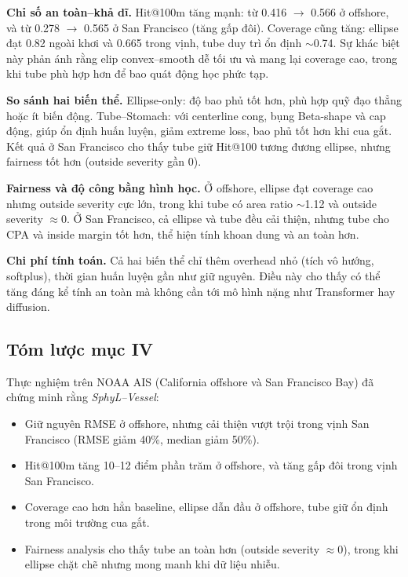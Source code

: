 \documentclass{IEEEtran}
\begin{document}
\textbf{Chỉ số an toàn--khả dĩ.} 
Hit@100m tăng mạnh: từ 0.416 $\to$ 0.566 ở offshore, 
và từ 0.278 $\to$ 0.565 ở San Francisco (tăng gấp đôi). 
Coverage cũng tăng: ellipse đạt 0.82 ngoài khơi và 0.665 trong vịnh, 
tube duy trì ổn định $\sim$0.74. 
Sự khác biệt này phản ánh rằng elip convex--smooth dễ tối ưu và mang lại coverage cao, 
trong khi tube phù hợp hơn để bao quát động học phức tạp.

\textbf{So sánh hai biến thể.} 
Ellipse-only: độ bao phủ tốt hơn, phù hợp quỹ đạo thẳng hoặc ít biến động.  
Tube--Stomach: với centerline cong, bụng Beta-shape và cap động, 
giúp ổn định huấn luyện, giảm extreme loss, bao phủ tốt hơn khi cua gắt.  
Kết quả ở San Francisco cho thấy tube giữ Hit@100 tương đương ellipse, 
nhưng fairness tốt hơn (outside severity gần 0).

\textbf{Fairness và độ công bằng hình học.} 
Ở offshore, ellipse đạt coverage cao nhưng outside severity cực lớn, 
trong khi tube có area ratio $\sim$1.12 và outside severity $\approx$0. 
Ở San Francisco, cả ellipse và tube đều cải thiện, 
nhưng tube cho CPA và inside margin tốt hơn, thể hiện tính khoan dung và an toàn hơn.

\textbf{Chi phí tính toán.} 
Cả hai biến thể chỉ thêm overhead nhỏ (tích vô hướng, softplus), 
thời gian huấn luyện gần như giữ nguyên. 
Điều này cho thấy có thể tăng đáng kể tính an toàn mà không cần tới 
mô hình nặng như Transformer hay diffusion.

\subsection{Tóm lược mục IV}
Thực nghiệm trên NOAA AIS (California offshore và San Francisco Bay) đã chứng minh rằng \emph{SphyL--Vessel}:
\begin{itemize}
  \item Giữ nguyên RMSE ở offshore, nhưng cải thiện vượt trội trong vịnh San Francisco (RMSE giảm 40\%, median giảm 50\%).
  \item Hit@100m tăng 10--12 điểm phần trăm ở offshore, và tăng gấp đôi trong vịnh San Francisco.
  \item Coverage cao hơn hẳn baseline, ellipse dẫn đầu ở offshore, tube giữ ổn định trong môi trường cua gắt.
  \item Fairness analysis cho thấy tube an toàn hơn (outside severity $\approx$0), 
        trong khi ellipse chặt chẽ nhưng mong manh khi dữ liệu nhiễu.
\end{itemize}
\end{document}
